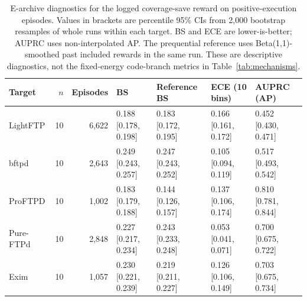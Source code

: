 \begin{table}[t]
\centering\footnotesize
\caption{E-archive diagnostics for the logged coverage-save reward on positive-execution episodes. Values in brackets are percentile 95\% CIs from 2,000 bootstrap resamples of whole runs within each target. BS and ECE are lower-is-better; AUPRC uses non-interpolated AP. The prequential reference uses Beta(1,1)-smoothed past included rewards in the same run. These are descriptive diagnostics, not the fixed-energy code-branch metrics in Table~\ref{tab:mechanisms}.}
\label{tab:logged_calibration}
\begin{tabularx}{\textwidth}{l r r *{4}{>{\centering\arraybackslash}X}}
\toprule
Target & $n$ & Episodes & BS & Reference BS & ECE (10 bins) & AUPRC (AP) \\
\midrule
LightFTP & 10 & 6,622 & \shortstack{0.188\\{[0.178, 0.198]}} & \shortstack{0.183\\{[0.172, 0.195]}} & \shortstack{0.166\\{[0.161, 0.172]}} & \shortstack{0.452\\{[0.430, 0.471]}} \\
bftpd & 10 & 2,643 & \shortstack{0.249\\{[0.243, 0.257]}} & \shortstack{0.247\\{[0.243, 0.252]}} & \shortstack{0.105\\{[0.094, 0.119]}} & \shortstack{0.517\\{[0.493, 0.542]}} \\
ProFTPD & 10 & 1,002 & \shortstack{0.183\\{[0.179, 0.188]}} & \shortstack{0.144\\{[0.126, 0.157]}} & \shortstack{0.137\\{[0.106, 0.174]}} & \shortstack{0.810\\{[0.781, 0.844]}} \\
Pure-FTPd & 10 & 2,848 & \shortstack{0.227\\{[0.217, 0.234]}} & \shortstack{0.243\\{[0.233, 0.248]}} & \shortstack{0.053\\{[0.041, 0.071]}} & \shortstack{0.700\\{[0.675, 0.722]}} \\
Exim & 10 & 1,057 & \shortstack{0.230\\{[0.221, 0.239]}} & \shortstack{0.219\\{[0.211, 0.227]}} & \shortstack{0.126\\{[0.106, 0.149]}} & \shortstack{0.703\\{[0.675, 0.734]}} \\

\end{tabularx}
\end{table}
